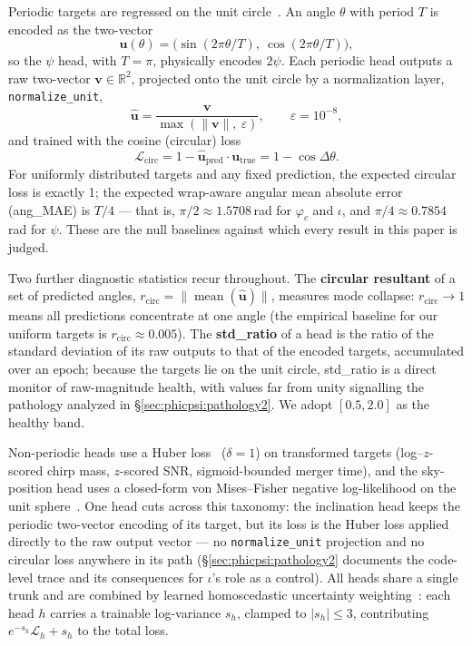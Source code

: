 \documentclass[11pt]{article}
\begin{document}
Periodic targets are regressed on the unit circle~\citep{mardia2000circular}.
An angle $\theta$ with period $T$ is encoded as the two-vector
\begin{equation}
    \mathbf{u}(\theta) = \bigl(\sin(2\pi\theta/T),\ \cos(2\pi\theta/T)\bigr),
\end{equation}
so the $\psi$ head, with $T=\pi$, physically encodes $2\psi$.
Each periodic head outputs a raw two-vector $\mathbf{v} \in \mathbb{R}^2$, projected onto the unit circle by a normalization layer, \texttt{normalize\_unit},
\begin{equation}
    \hat{\mathbf{u}} = \frac{\mathbf{v}}{\max(\lVert\mathbf{v}\rVert,\ \varepsilon)},
    \qquad \varepsilon = 10^{-8},
\end{equation}
and trained with the cosine (circular) loss
\begin{equation}
    \mathcal{L}_{\mathrm{circ}}
    = 1 - \hat{\mathbf{u}}_{\mathrm{pred}} \cdot \mathbf{u}_{\mathrm{true}}
    = 1 - \cos\Delta\theta .
    \label{eq:circloss}
\end{equation}
For uniformly distributed targets and any fixed prediction, the expected circular loss is exactly 1; the expected wrap-aware angular mean absolute error (ang\_MAE) is $T/4$ --- that is, $\pi/2 \approx 1.5708$\,rad for $\varphi_c$ and $\iota$, and $\pi/4 \approx 0.7854$\,rad for $\psi$.
These are the null baselines against which every result in this paper is judged.

Two further diagnostic statistics recur throughout.
The \textbf{circular resultant} of a set of predicted angles, $r_{\mathrm{circ}} = \lVert \operatorname{mean}(\hat{\mathbf{u}}) \rVert$, measures mode collapse: $r_{\mathrm{circ}} \to 1$ means all predictions concentrate at one angle (the empirical baseline for our uniform targets is $r_{\mathrm{circ}} \approx 0.005$).
The \textbf{std\_ratio} of a head is the ratio of the standard deviation of its raw outputs to that of the encoded targets, accumulated over an epoch; because the targets lie on the unit circle, std\_ratio is a direct monitor of raw-magnitude health, with values far from unity signalling the pathology analyzed in \S\ref{sec:phicpsi:pathology2}.
We adopt $[0.5, 2.0]$ as the healthy band.

Non-periodic heads use a Huber loss~\citep{huber1964robust} ($\delta=1$) on transformed targets (log--$z$-scored chirp mass, $z$-scored SNR, sigmoid-bounded merger time), and the sky-position head uses a closed-form von Mises--Fisher negative log-likelihood on the unit sphere~\citep{fisher1953dispersion}.
One head cuts across this taxonomy: the inclination head keeps the periodic two-vector encoding of its target, but its loss is the Huber loss applied directly to the raw output vector --- no \texttt{normalize\_unit} projection and no circular loss anywhere in its path (\S\ref{sec:phicpsi:pathology2} documents the code-level trace and its consequences for $\iota$'s role as a control).
All heads share a single trunk and are combined by learned homoscedastic uncertainty weighting~\citep{kendall2018multi}: each head $h$ carries a trainable log-variance $s_h$, clamped to $|s_h| \le 3$, contributing $e^{-s_h}\mathcal{L}_h + s_h$ to the total loss.
\end{document}
